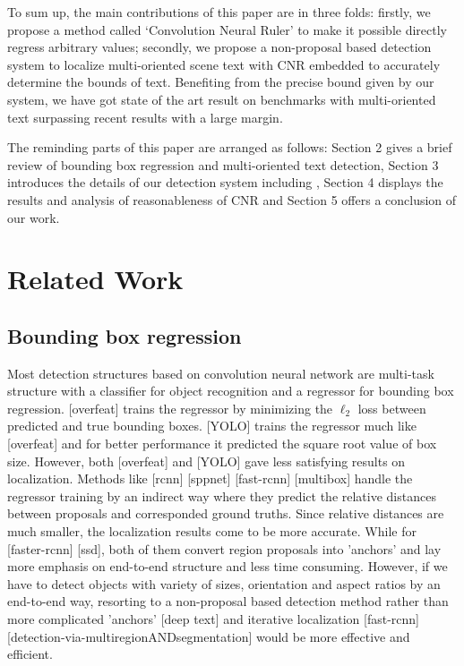 \documentclass[10pt,twocolumn,letterpaper]{article}
\begin{document}
To sum up, the main contributions of this paper are in three folds: firstly, we propose a method called ‘Convolution Neural Ruler’ to make it possible directly regress arbitrary values; secondly, we propose a non-proposal based detection system to localize multi-oriented scene text with CNR embedded to accurately determine the bounds of text. Benefiting from the precise bound given by our system, we have got state of the art result on benchmarks with multi-oriented text surpassing recent results with a large margin. 

The reminding parts of this paper are arranged as follows: Section 2 gives a brief review of bounding box regression and multi-oriented text detection, Section 3 introduces the details of our detection system including , Section 4 displays the results and analysis of reasonableness of CNR and Section 5 offers a conclusion of our work.

\section{Related Work}
\subsection{Bounding box regression}
Most detection structures based on convolution neural network are multi-task structure with a classifier for object recognition and a regressor for bounding box regression. 
[overfeat] trains the regressor by minimizing the $\ell_2$ loss between predicted and true bounding boxes. 
[YOLO] trains the regressor much like [overfeat] and for better performance it predicted the square root value of box size. However, both [overfeat] and [YOLO] gave less satisfying results on localization. 
Methods like [rcnn] [sppnet] [fast-rcnn] [multibox] handle the regressor training by an indirect way where they predict the relative distances between proposals and corresponded ground truths. Since relative distances are much smaller, the localization results come to be more accurate.
While for [faster-rcnn] [ssd], both of them convert region proposals into 'anchors' and lay more emphasis on end-to-end structure and less time consuming.
However, if we have to detect objects with variety of sizes, orientation and aspect ratios by an end-to-end way, resorting to a non-proposal based detection method rather than more complicated 'anchors' [deep text] and iterative localization [fast-rcnn] [detection-via-multiregionANDsegmentation] would be more effective and efficient.
\end{document}
